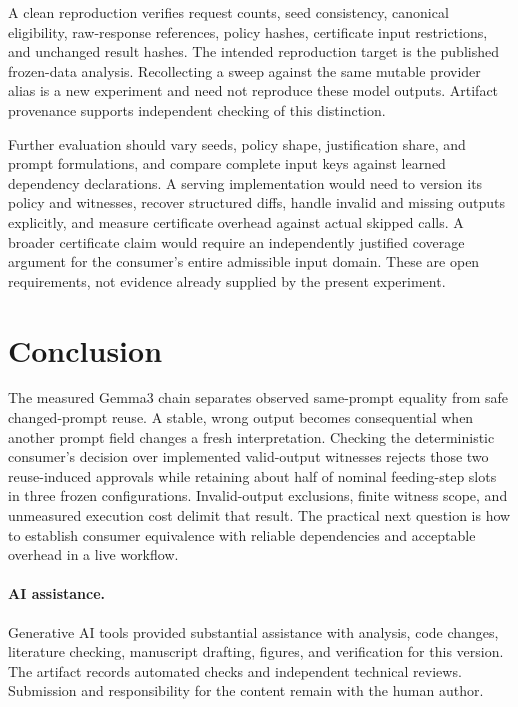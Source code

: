 A clean reproduction verifies request counts, seed consistency, canonical eligibility, raw-response references, policy hashes, certificate input restrictions, and unchanged result hashes. The intended reproduction target is the published frozen-data analysis. Recollecting a sweep against the same mutable provider alias is a new experiment and need not reproduce these model outputs. Artifact provenance supports independent checking of this distinction.

Further evaluation should vary seeds, policy shape, justification share, and prompt formulations, and compare complete input keys against learned dependency declarations. A serving implementation would need to version its policy and witnesses, recover structured diffs, handle invalid and missing outputs explicitly, and measure certificate overhead against actual skipped calls. A broader certificate claim would require an independently justified coverage argument for the consumer's entire admissible input domain. These are open requirements, not evidence already supplied by the present experiment.
\fi

\FloatBarrier
\section{Conclusion}
The measured Gemma3 chain separates observed same-prompt equality from safe changed-prompt reuse. A stable, wrong output becomes consequential when another prompt field changes a fresh interpretation. Checking the deterministic consumer's decision over implemented valid-output witnesses rejects those two reuse-induced approvals while retaining about half of nominal feeding-step slots in three frozen configurations. Invalid-output exclusions, finite witness scope, and unmeasured execution cost delimit that result. The practical next question is how to establish consumer equivalence with reliable dependencies and acceptable overhead in a live workflow.

\paragraph{AI assistance.}
Generative AI tools provided substantial assistance with analysis, code changes, literature checking, manuscript drafting, figures, and verification for this version. The artifact records automated checks and independent technical reviews. Submission and responsibility for the content remain with the human author.
\label{sec:body-end}
